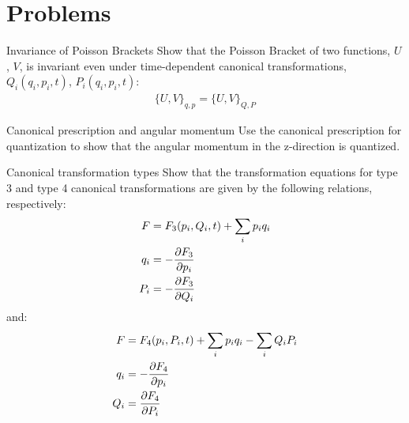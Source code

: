 %
\section{Problems}

\begin{problem}{Invariance of Poisson Brackets} Show that the Poisson Bracket of two functions, $U$, $V$, is invariant even under time-dependent canonical transformations, $Q_i(q_i,p_i,t)$, $P_i(q_i,p_i,t)$:
\begin{align*}
\{U,V\}_{q,p}=\{U,V\}_{Q,P}
\end{align*}
\label{prob_CT_1}
\end{problem}

\begin{problem}{Canonical prescription and angular momentum}
Use the canonical prescription for quantization to show that the angular momentum in the z-direction is quantized.
\label{prob_CT_2}
\end{problem}

\begin{problem}{Canonical transformation types}
Show that the transformation equations for type 3 and type 4 canonical transformations are given by the following relations, respectively:
\begin{align*}
F&=F_3(p_i,Q_i,t)+\sum_ip_iq_i \\
q_i&=-\frac{\partial F_3}{\partial p_i}\\
P_i&=-\frac{\partial F_3}{\partial Q_i}\\
\end{align*}
and:
\begin{align*}
F&=F_4(p_i,P_i,t)+\sum_ip_iq_i-\sum_iQ_iP_i\\
q_i&=-\frac{\partial F_4}{\partial p_i}\\
Q_i&=\frac{\partial F_4}{\partial P_i}\\
\end{align*}
\label{prob_CT_3}
\end{problem}

